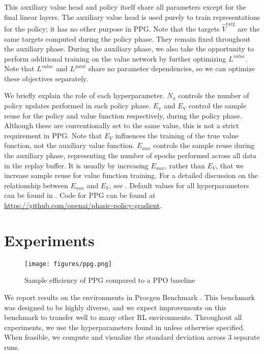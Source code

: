 \documentclass{article}
\begin{document}
This auxiliary value head and policy itself share all parameters except for the final linear layers. The auxiliary value head is used purely to train representations for the policy; it has no other purpose in PPG. Note that the targets $\hat{V}^{\text{targ}}$ are the same targets computed during the policy phase. They remain fixed throughout the auxiliary phase. During the auxiliary phase, we also take the opportunity to perform additional training on the value network by further optimizing $L^{value}$. Note that $L^{value}$ and $L^{joint}$ share no parameter dependencies, so we can optimize these objectives separately. 

We briefly explain the role of each hyperparameter. $N_{\pi}$ controls the number of policy updates performed in each policy phase. $E_{\pi}$ and $E_V$ control the sample reuse for the policy and value function respectively, during the policy phase. Although these are conventionally set to the same value, this is not a strict requirement in PPG. Note that $E_V$ influences the training of the true value function, not the auxiliary value function. $E_{aux}$ controls the sample reuse during the auxiliary phase, representing the number of epochs performed across all data in the replay buffer. It is usually by increasing $E_{aux}$, rather than $E_V$, that we increase sample reuse for value function training. For a detailed discussion on the relationship between $E_{aux}$ and $E_V$, see . Default values for all hyperparameters can be found in . Code for PPG can be found at \href{https://github.com/openai/phasic-policy-gradient}{https://github.com/openai/phasic-policy-gradient}.

\section{Experiments}

\begin{figure*}
\centering
\texttt{[image: figures/ppg.png]}
\caption{Sample efficiency of PPG compared to a PPO baseline}
\label{fig:ppg_vs_ppo}
\end{figure*}

We report results on the environments in Procgen Benchmark \citep{procgen}. This benchmark was designed to be highly diverse, and we expect improvements on this benchmark to transfer well to many other RL environments. Throughout all experiments, we use the hyperparameters found in  unless otherwise specified. When feasible, we compute and visualize the standard deviation across 3 separate runs.
\end{document}
